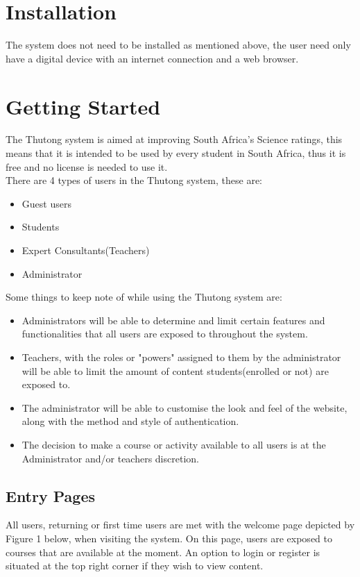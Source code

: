 \documentclass[12pt,a4paper]{article}
\begin{document}
		
	\section{Installation}
		The system does not need to be installed as mentioned above, the user need only have a digital device with an internet connection and a web browser.
		
	\section{Getting Started}
		The Thutong system is aimed at improving South Africa's Science ratings, this means that it is intended to be used by every student in South Africa, thus it is free and no license is needed to use it.\\
		There are 4 types of users in the Thutong system, these are:
		\begin{itemize}
			\item Guest users
			\item Students
			\item Expert Consultants(Teachers)
			\item Administrator\\
		\end{itemize} 
		
		Some things to keep note of while using the Thutong system are:
		\begin{itemize}
			\item Administrators will be able to determine and limit certain features and functionalities that all users are exposed to throughout the system.
			\item Teachers, with the roles or "powers" assigned to them by the administrator will be able to limit the amount of content students(enrolled or not) are exposed to.
			\item The administrator will be able to customise the look and feel of the website, along with the method and style of authentication.
			\item The decision to make a course or activity available to all users is at the Administrator and/or teachers discretion. 
		\end{itemize} 
		  
		\subsection{Entry Pages}
			All users, returning or first time users are met with the welcome page depicted by Figure 1 below, when visiting the system. On this page, users are exposed to courses that are available at the moment. An option to login or register is situated at the top right corner if they wish to view content.
			
\end{document}
